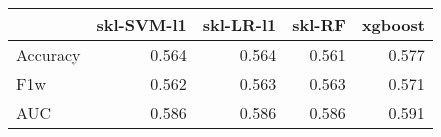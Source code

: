 \begin{tabular}{lrrrr}
\toprule
{} &  skl-SVM-l1 &  skl-LR-l1 &  skl-RF &  xgboost \\
\midrule
Accuracy &       0.564 &      0.564 &   0.561 &    0.577 \\
F1w      &       0.562 &      0.563 &   0.563 &    0.571 \\
AUC      &       0.586 &      0.586 &   0.586 &    0.591 \\
\bottomrule
\end{tabular}
